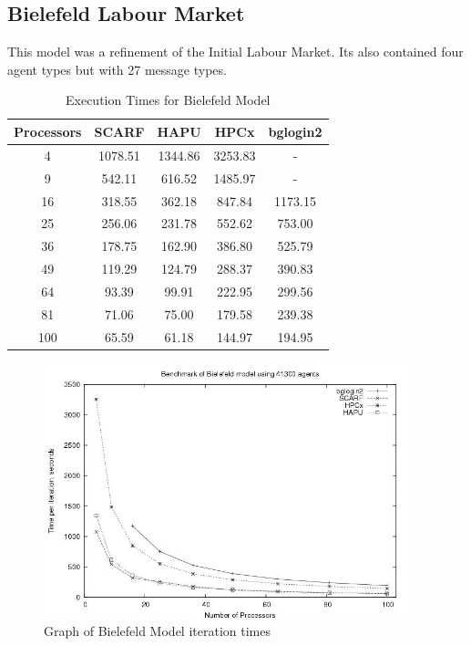 \subsection{Bielefeld Labour Market}
This model was a refinement of the Initial Labour Market. Its also contained four agent types but with 27 message types.
{
\renewcommand{\arraystretch}{1.25}
\begin{table}[ht]
 \centering
  \begin{tabular}{c|cccc}
 Processors &SCARF &HAPU &HPCx   &bglogin2 \\ \hline
4 &1078.51 &1344.86 &3253.83 &- \\
9 &542.11 &616.52 &1485.97 &-   \\
16 &318.55 &362.18 &847.84 &1173.15     \\
25 &256.06 &231.78 &552.62 &753.00      \\
36 &178.75 &162.90 &386.80 &525.79      \\
49 &119.29 &124.79 &288.37 &390.83      \\
64 &93.39 &99.91 &222.95 &299.56        \\
81 &71.06 &75.00 &179.58 &239.38        \\
100 &65.59 &61.18 &144.97 &194.95       \\

 \end{tabular}
 \caption{Execution Times for Bielefeld Model}
 \label{tab:ExecutionTimesForBielefeld}
\end{table}
}
\bigskip
\begin{figure}[ht]
 \centering
  \includegraphics[width=300pt]{Bielefeld2-graph.jpg}
 \caption{Graph of Bielefeld Model iteration times}
 \label{fig:Labour-graph2}
\end{figure}

